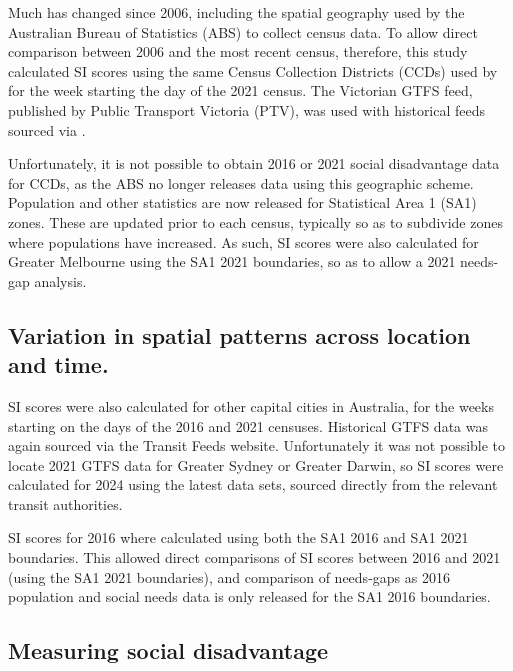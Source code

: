 \documentclass[preprint, 3p,
authoryear]{elsarticle} %
\begin{document}
Much has changed since 2006, including the spatial geography used by the
Australian Bureau of Statistics (ABS) to collect census data. To allow
direct comparison between 2006 and the most recent census, therefore,
this study calculated SI scores using the same Census Collection
Districts (CCDs) used by \citet{currie2010identifying} for the week
starting the day of the 2021 census. The Victorian GTFS feed, published
by Public Transport Victoria (PTV), was used with historical feeds
sourced via \citet{transitfeeds_victoria:2023aa}.

Unfortunately, it is not possible to obtain 2016 or 2021 social
disadvantage data for CCDs, as the ABS no longer releases data using
this geographic scheme. Population and other statistics are now released
for Statistical Area 1 (SA1) zones. These are updated prior to each
census, typically so as to subdivide zones where populations have
increased. As such, SI scores were also calculated for Greater Melbourne
using the SA1 2021 boundaries, so as to allow a 2021 needs-gap analysis.

\subsection{Variation in spatial patterns across location and
time.}\label{variation-in-spatial-patterns-across-location-and-time.}

SI scores were also calculated for other capital cities in Australia,
for the weeks starting on the days of the 2016 and 2021 censuses.
Historical GTFS data was again sourced via the Transit Feeds website.
Unfortunately it was not possible to locate 2021 GTFS data for Greater
Sydney or Greater Darwin, so SI scores were calculated for 2024 using
the latest data sets, sourced directly from the relevant transit
authorities.

SI scores for 2016 where calculated using both the SA1 2016 and SA1 2021
boundaries. This allowed direct comparisons of SI scores between 2016
and 2021 (using the SA1 2021 boundaries), and comparison of needs-gaps
as 2016 population and social needs data is only released for the SA1
2016 boundaries.

\subsection{Measuring social
disadvantage}\label{measuring-social-disadvantage}
\end{document}
